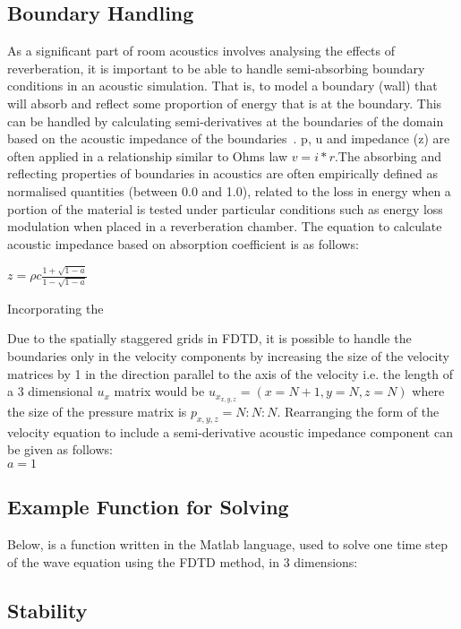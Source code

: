 \subsection{Boundary Handling}
As a significant part of room acoustics involves analysing the effects of reverberation, it is important to be able to handle semi-absorbing boundary conditions in an acoustic simulation. That is, to model a boundary (wall) that will absorb and reflect some proportion of energy that is at the boundary. This can be handled by calculating semi-derivatives at the boundaries of the domain based on the acoustic impedance of the boundaries~\cite{Olesen1997}\cite{Hill2012}. p, u and impedance (z) are often applied in a relationship similar to Ohms law $v = i * r $.The absorbing and reflecting properties of boundaries in acoustics are often empirically defined as normalised quantities (between 0.0 and 1.0), related to the loss in energy when a portion of the material is tested under particular conditions such as energy loss modulation when placed in a reverberation chamber. The equation to calculate acoustic impedance based on absorption coefficient is as follows:\\
\begin{center}
$z = \rho c \frac{1 + \sqrt{1 - a}}{1 - \sqrt{1 - a}} $\\
\end{center}
Incorporating the 

Due to the spatially staggered grids in FDTD, it is possible to handle the boundaries only in the velocity components by increasing the size of the  velocity matrices by 1 in the direction parallel to the axis of the velocity i.e. the length of a 3 dimensional $u_x$ matrix would be $u_{x_{x,y,z}} = (x = N+1, y = N, z = N)$ where the size of the pressure matrix is $p_{x,y,z} = N:N:N$. Rearranging the form of the velocity equation to include a semi-derivative acoustic impedance component can be given as follows:\\
$ a = 1 $


\subsection{Example Function for Solving}
Below, is a function written in the Matlab \textregistered language, used to solve one time step of the wave equation using the FDTD method, in 3 dimensions:


\subsection{Stability}
 

